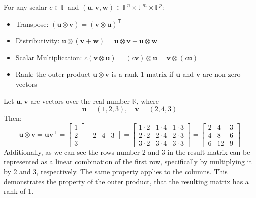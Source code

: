 \documentclass[../lecture-notes-148x210.tex]{subfiles}
\begin{document}
\begin{lemma}
    For any scalar $c \in \mathbb{F}$ and $(\mathbf{u}, \mathbf{v}, \mathbf{w}) \in \mathbb{F}^n \times \mathbb{F}^m \times \mathbb{F}^p$:
    \begin{itemize}
        \item Transpose: $(\mathbf{u} \otimes \mathbf{v}) = (\mathbf{v} \otimes \mathbf{u})^{\textsf{T}}$
        \item Distributivity: $\mathbf{u} \otimes (\mathbf{v} + \mathbf{w}) = \mathbf{u} \otimes \mathbf{v} + \mathbf{u} \otimes \mathbf{w}$
        \item Scalar Multiplication: $c(\mathbf{v} \otimes \mathbf{u}) = (c\mathbf{v}) \otimes \mathbf{u} = \mathbf{v} \otimes (c\mathbf{u})$
        \item Rank: the outer product $\mathbf{u} \otimes \mathbf{v}$ is a rank-1 matrix if $\mathbf{u}$ and $\mathbf{v}$ are non-zero
        vectors
    \end{itemize}
\end{lemma}

\begin{example}
    Let $\mathbf{u}, \mathbf{v}$ are vectors over the real number $\mathbb{R}$, where
    \begin{equation*}
        \mathbf{u} = (1, 2, 3), \quad \mathbf{v} = (2, 4, 3)
    \end{equation*}
    Then: 
    \begin{equation*}
        \mathbf{u} \otimes \mathbf{v} = \mathbf{u}\mathbf{v}^{\top} = \begin{bmatrix}
        1 \\ 2 \\ 3
        \end{bmatrix}\begin{bmatrix}
        2 & 4 & 3
        \end{bmatrix} = \begin{bmatrix}
            1 \cdot 2 & 1 \cdot 4 & 1 \cdot 3 \\
            2 \cdot 2 & 2 \cdot 4 & 2 \cdot 3 \\
            3 \cdot 2 & 3 \cdot 4 & 3 \cdot 3
        \end{bmatrix} = \begin{bmatrix}
            2 & 4 & 3 \\
            4 & 8 & 6 \\
            6 & 12 & 9
        \end{bmatrix}
    \end{equation*}
    Additionally, as we can see the rows number 2 and 3 in the result matrix can be represented
    as a linear combination of the first row, specifically by multiplying it by 2 and 3, 
    respectively. The same property applies to the columns. This demonstrates the property of the
    outer product, that the resulting matrix has a rank of 1.
\end{example}
\end{document}
